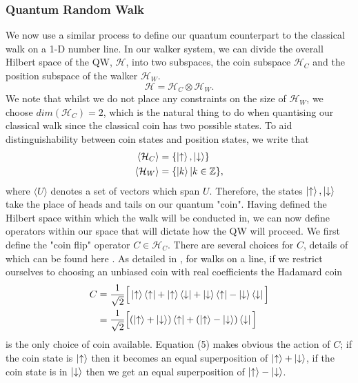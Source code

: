 \subsubsection{Quantum Random Walk}
We now use a similar process to define our quantum counterpart to the classical walk on a 1-D number line. 
In our walker system, we can divide the overall Hilbert space of the QW, $\mathcal{H}$, into two subspaces, the coin subspace $\mathcal{H}_C$ and the position subspace of the walker $\mathcal{H}_W$. 
\begin{equation}
    \mathcal{H} = \mathcal{H}_C \otimes \mathcal{H}_W.
\end{equation}
We note that whilst we do not place any constraints on the size of $\mathcal{H}_W$, we choose $dim(\mathcal{H}_C) = 2$, which is the natural thing to do when quantising our classical walk since the classical coin has two possible states. 
To aid distinguishability between coin states and position states, we write that
\begin{align}
    \langle\mathcal{H}_C\rangle &= \{\ket{\uparrow}, \ket{\downarrow}\}\\
    \langle\mathcal{H}_W\rangle &= \{\ket{k} | k\in\mathbb{Z}\},
\end{align}
where $\langle U \rangle$ denotes a set of vectors which span $U$. 
Therefore, the states $\ket{\uparrow}, \ket{\downarrow}$ take the place of heads and tails on our quantum "coin". 
Having defined the Hilbert space within which the walk will be conducted in, we can now define operators within our space that will dictate how the QW will proceed. We first define the "coin flip" operator $C\in \mathcal{H}_C$. 
There are several choices for $C$, details of which can be found here \cite{Tregenna2003}. 
As detailed in \cite{Tregenna2003}, for walks on a line, if we restrict ourselves to choosing an unbiased coin with real coefficients the Hadamard coin
\begin{align}
    C &= \frac{1}{\sqrt{2}}\Big[
    \ket{\uparrow}\bra{\uparrow} +
    \ket{\uparrow}\bra{\downarrow} +
    \ket{\downarrow}\bra{\uparrow} -
    \ket{\downarrow}\bra{\downarrow}\Big]\\
    &= \frac{1}{\sqrt{2}}\Big[(\ket{\uparrow} + \ket{\downarrow})\bra{\uparrow} +
    (\ket{\uparrow} - \ket{\downarrow})\bra{\downarrow}\Big]
\end{align}
is the only choice of coin available. 
Equation (5) makes obvious the action of $C$; if the coin state is $\ket{\uparrow}$ then it becomes an equal superposition of $\ket{\uparrow} + \ket{\downarrow}$, if the coin state is in $\ket{\downarrow}$ then we get an equal superposition of $\ket{\uparrow} - \ket{\downarrow}$. 
